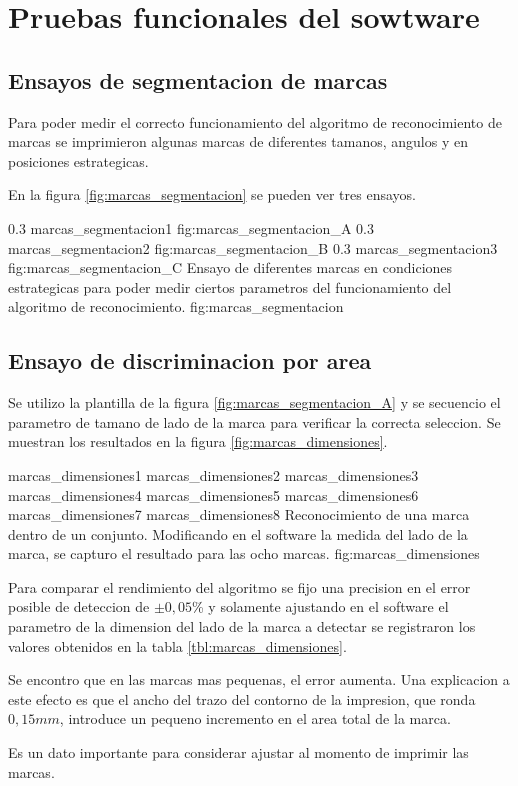 \section{Pruebas funcionales del sowtware}
\label{sec:pruebasHW}

\subsection{Ensayos de segmentacion de marcas}
Para poder medir el correcto funcionamiento del algoritmo de reconocimiento de marcas se imprimieron algunas marcas de diferentes tamanos, angulos y en posiciones estrategicas.\par
En la figura \ref{fig:marcas_segmentacion} se pueden ver tres ensayos.

   \subfigabc
   {0.3} {marcas_segmentacion1} {} {fig:marcas_segmentacion_A}
   {0.3} {marcas_segmentacion2} {} {fig:marcas_segmentacion_B}
   {0.3} {marcas_segmentacion3} {} {fig:marcas_segmentacion_C}
   {Ensayo de diferentes marcas en condiciones estrategicas para poder medir ciertos parametros del funcionamiento del algoritmo de reconocimiento.}
   {fig:marcas_segmentacion}

\subsection{Ensayo de discriminacion por area}

Se utilizo la plantilla de la figura \ref{fig:marcas_segmentacion_A} y se secuencio el parametro de tamano de lado de la marca para verificar la correcta seleccion.
Se muestran los resultados en la figura \ref{fig:marcas_dimensiones}.

\subfigfourfour
   {marcas_dimensiones1}
   {marcas_dimensiones2}
   {marcas_dimensiones3}
   {marcas_dimensiones4}
   {marcas_dimensiones5}
   {marcas_dimensiones6}
   {marcas_dimensiones7}
   {marcas_dimensiones8}
   {Reconocimiento de una marca dentro de un conjunto. Modificando en el software la medida del lado de la marca, se capturo el resultado para las ocho marcas.}
   {fig:marcas_dimensiones}

   Para comparar el rendimiento del algoritmo se fijo una precision en el error posible de deteccion de $\pm0,05$\% y solamente ajustando en el software el parametro de la dimension del lado de la marca a detectar se registraron los valores obtenidos en la tabla \ref{tbl:marcas_dimensiones}.\par

Se encontro que en las marcas mas pequenas, el error aumenta. Una explicacion a este efecto es que el ancho del trazo del contorno de la impresion, que ronda $0,15mm$, introduce un pequeno incremento en el area total de la marca. \par 
Es un dato importante para considerar ajustar al momento de imprimir las marcas.

